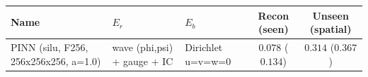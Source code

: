 \begin{center}
\begin{tabular}{lll cc}
\toprule
Name & $E_r$ & $E_b$ & Recon (seen) & Unseen (spatial) \\
\midrule
PINN (silu, F256, 256x256x256, a=1.0) & wave (phi,psi) + gauge + IC & Dirichlet u=v=w=0 & $0.078$ ($0.134$) & $0.314$ ($0.367$) \\
\bottomrule
\end{tabular}
\end{center}

